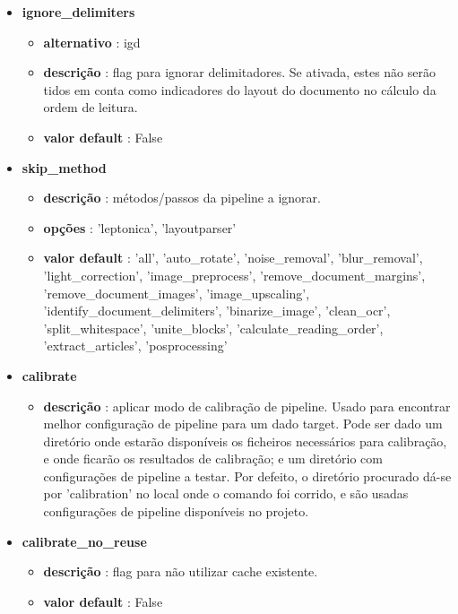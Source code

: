 \begin{itemize}
	\item \textbf{ignore\_delimiters}
		\begin{itemize}\setlength\itemsep{-0.5em}
			\item \textbf{alternativo} : igd
			\item \textbf{descrição} : flag para ignorar delimitadores. Se ativada, estes não serão tidos em conta como indicadores do layout do documento no cálculo da ordem de leitura.
			\item \textbf{valor default} : False
		\end{itemize}
	
	\item \textbf{skip\_method}
		\begin{itemize}\setlength\itemsep{-0.5em}
			\item \textbf{descrição} : métodos/passos da pipeline a ignorar.
			\item \textbf{opções} : 'leptonica', 'layoutparser'
			\item \textbf{valor default} : 'all', 'auto\_rotate', 'noise\_removal', 'blur\_removal', 'light\_correction', 'image\_preprocess', 'remove\_document\_margins', 'remove\_document\_images', 'image\_upscaling', 'identify\_document\_delimiters', 'binarize\_image', 'clean\_ocr', 'split\_whitespace', 'unite\_blocks', 'calculate\_reading\_order', 'extract\_articles', 'posprocessing'
		\end{itemize}
	
	\item \textbf{calibrate}
		\begin{itemize}\setlength\itemsep{-0.5em}
			\item \textbf{descrição} : aplicar modo de calibração de pipeline. Usado para encontrar melhor configuração de pipeline para um dado target. Pode ser dado um diretório onde estarão disponíveis os ficheiros necessários para calibração, e onde ficarão os resultados de calibração; e um diretório com configurações de pipeline a testar. Por defeito, o diretório procurado dá-se por 'calibration' no local onde o comando foi corrido, e são usadas configurações de pipeline disponíveis no projeto. 
		\end{itemize}
	
	\item \textbf{calibrate\_no\_reuse}
		\begin{itemize}\setlength\itemsep{-0.5em}
			\item \textbf{descrição} : flag para não utilizar cache existente.
			\item \textbf{valor default} : False
		\end{itemize}
	

\end{itemize}
